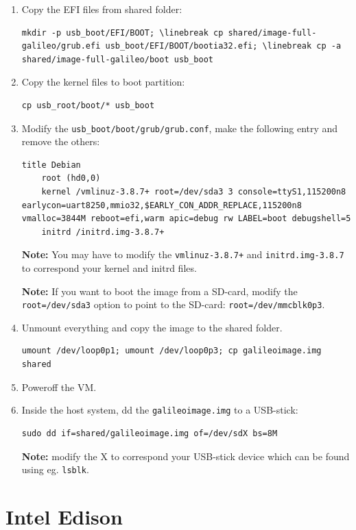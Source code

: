\documentclass[a4paper,11pt]{article}
\newcommand{\note}{\textbf{Note: }}
\newcommand{\cmd}[1]{\texttt{#1}}
\begin{document}
\begin{enumerate}
\item Copy the EFI files from shared folder: 
\begin{lstlisting}
mkdir -p usb_boot/EFI/BOOT; \linebreak cp shared/image-full-galileo/grub.efi usb_boot/EFI/BOOT/bootia32.efi; \linebreak cp -a shared/image-full-galileo/boot usb_boot
\end{lstlisting}

\item Copy the kernel files to boot partition: 
\begin{lstlisting}
cp usb_root/boot/* usb_boot
\end{lstlisting}

\item Modify the \cmd{usb\_boot/boot/grub/grub.conf}, make the following entry and remove the others:
\begin{lstlisting}
title Debian
    root (hd0,0)
    kernel /vmlinuz-3.8.7+ root=/dev/sda3 3 console=ttyS1,115200n8 earlycon=uart8250,mmio32,$EARLY_CON_ADDR_REPLACE,115200n8 vmalloc=3844M reboot=efi,warm apic=debug rw LABEL=boot debugshell=5
    initrd /initrd.img-3.8.7+
\end{lstlisting}
\note You may have to modify the \cmd{vmlinuz-3.8.7+} and \cmd{initrd.img-3.8.7} to correspond your kernel and initrd files.

\note If you want to boot the image from a SD-card, modify the \cmd{root=/dev/sda3} option to point to the SD-card: \cmd{root=/dev/mmcblk0p3}.

\item Unmount everything and copy the image to the shared folder. 
\begin{lstlisting}
umount /dev/loop0p1; umount /dev/loop0p3; cp galileoimage.img shared
\end{lstlisting}

\item Poweroff the VM.

\item Inside the host system, dd the \cmd{galileoimage.img} to a USB-stick: 
\begin{lstlisting}
sudo dd if=shared/galileoimage.img of=/dev/sdX bs=8M
\end{lstlisting}

\note modify the X to correspond your USB-stick device which can be found using eg. \cmd{lsblk}.
\end{enumerate}

\section{Intel Edison}
\label{edison}
\end{document}
